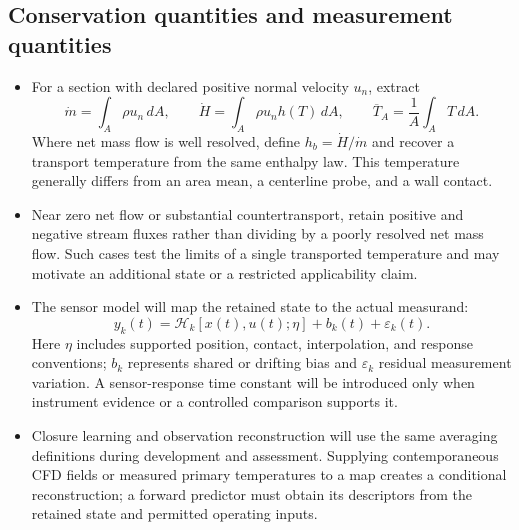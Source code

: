 \subsection{Conservation quantities and measurement quantities}\label{subsec:conservation-versus-measurement-quantities}
\begin{itemize}[leftmargin=*]
\item For a section with declared positive normal velocity $u_n$, extract
\begin{equation}
\dot m=\int_A\rho u_n\,dA,\qquad
\dot H=\int_A\rho u_n h(T)\,dA,\qquad
\overline T_A=\frac{1}{A}\int_A T\,dA.
\label{eq:section-reduction}
\end{equation}
Where net mass flow is well resolved, define $h_b=\dot H/\dot m$ and recover a transport temperature from the same enthalpy law. This temperature generally differs from an area mean, a centerline probe, and a wall contact.
\item Near zero net flow or substantial countertransport, retain positive and negative stream fluxes rather than dividing by a poorly resolved net mass flow. Such cases test the limits of a single transported temperature and may motivate an additional state or a restricted applicability claim.
\item The sensor model will map the retained state to the actual measurand:
\begin{equation}
y_k(t)=\mathcal H_k[x(t),u(t);\eta]+b_k(t)+\varepsilon_k(t).
\label{eq:sensor-observation}
\end{equation}
Here $\eta$ includes supported position, contact, interpolation, and response conventions; $b_k$ represents shared or drifting bias and $\varepsilon_k$ residual measurement variation. A sensor-response time constant will be introduced only when instrument evidence or a controlled comparison supports it.\cite{jcgm2020measurementmodels}
\item Closure learning and observation reconstruction will use the same averaging definitions during development and assessment. Supplying contemporaneous CFD fields or measured primary temperatures to a map creates a conditional reconstruction; a forward predictor must obtain its descriptors from the retained state and permitted operating inputs.
\end{itemize}

